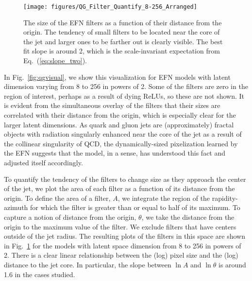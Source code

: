 \documentclass[letterpaper,11pt]{article}
\DeclareRobustCommand{\Fig}[1]{Fig.~\ref{#1}}
\DeclareRobustCommand{\Eq}[1]{Eq.~(\ref{#1})}
\begin{document}
\begin{figure}[p]
\centering
\texttt{[image: figures/QG\_Filter\_Quantify\_8-256\_Arranged]}
\caption{The size of the EFN filters as a function of their distance from the origin.
%
The tendency of small filters to be located near the core of the jet and larger ones to be farther out is clearly visible.
%
The best fit slope is around 2, which is the scale-invariant expectation from \Eq{eq:slope_two}.}
\label{fig:qgquant}
\end{figure}


In \Fig{fig:qgvisual}, we show this visualization for EFN models with latent dimension varying from 8 to 256 in powers of 2.
%
Some of the filters are zero in the region of interest, perhaps as a result of dying ReLUs, so these are not shown.
%
It is evident from the simultaneous overlay of the filters that their sizes are correlated with their distance from the origin, which is especially clear for the larger latent dimensions.
%
As quark and gluon jets are (approximately) fractal objects with radiation singularly enhanced near the core of the jet as a result of the collinear singularity of QCD, the dynamically-sized pixelization learned by the EFN suggests that the model, in a sense, has understood this fact and adjusted itself accordingly.


To quantify the tendency of the filters to change size as they approach the center of the jet, we plot the area of each filter as a function of its distance from the origin.
%
To define the area of a filter, $A$, we integrate the region of the rapidity-azimuth for which the filter is greater than or equal to half of its maximum.
%
To capture a notion of distance from the origin, $\theta$, we take the distance from the origin to the maximum value of the filter.
%
We exclude filters that have centers outside of the jet radius.
%
The resulting plots of the filters in this space are shown in \Fig{fig:qgquant} for the models with latent space dimension from 8 to 256 in powers of 2.
%
There is a clear linear relationship between the (log) pixel size and the (log) distance to the jet core.
%
In particular, the slope between $\ln A$ and $\ln \theta$ is around 1.6 in the cases studied.
\end{document}
